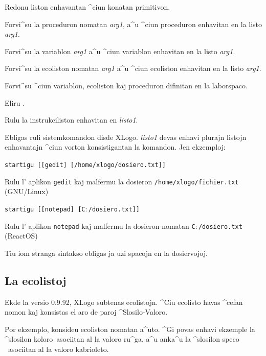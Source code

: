 
Redonu liston enhavantan ^ciun konatan primitivon.


Forvi^su la proceduron nomatan \textit{arg1}, a^u ^ciun proceduron
enhavitan en la listo \textit{arg1}.


Forvi^su la variablon \textit{arg1} a^u ^ciun variablon enhavitan en
la listo \textit{arg1}.


Forvi^su la ecoliston nomatan \textit{arg1} a^u ^ciun ecoliston
enhavitan en la listo \textit{arg1}.


Forvi^su ^ciun variablon, ecoliston kaj proceduron difinitan en la
laborspaco.


Eliru \xlogo.


Rulu la instrukciliston enhavitan en \textit{listo1}.


Ebligas ruli sistemkomandon disde XLogo.  \textit{listo1} devas enhavi
plurajn listojn enhavantajn ^ciun vorton konsistigantan la komandon.
Jen ekzemploj:

\texttt{startigu [[gedit] [/home/xlogo/dosiero.txt]]}

Rulu l' aplikon \texttt{gedit} kaj malfermu la dosieron
\texttt{/home/xlogo/fichier.txt} (GNU/Linux)

\texttt{startigu [[notepad] [C$\colon$/dosiero.txt]]}

Rulu l' aplikon \texttt{notepad} kaj malfermu la dosieron nomatan
\texttt{C$\colon$/dosiero.txt} (ReactOS)

Tiu iom stranga sintakso ebligas ja uzi spacojn en la dosiervojoj.

\subsection{La ecolistoj}

Ekde la versio 0.9.92, XLogo subtenas ecolistojn.  ^Ciu ecolisto havas
^cefan nomon kaj konsistas el aro de paroj ^Slosilo-Valoro.

Por ekzemplo, konsideu ecoliston nomatan \og a^uto\fg.  ^Gi povas
enhavi ekzemple la ^slosilon \og koloro\fg\ asociitan al la valoro \og
ru^ga\fg, a^u anka^u la ^slosilon \og speco \fg\ asociitan al la
valoro \og kabrioleto\fg.

